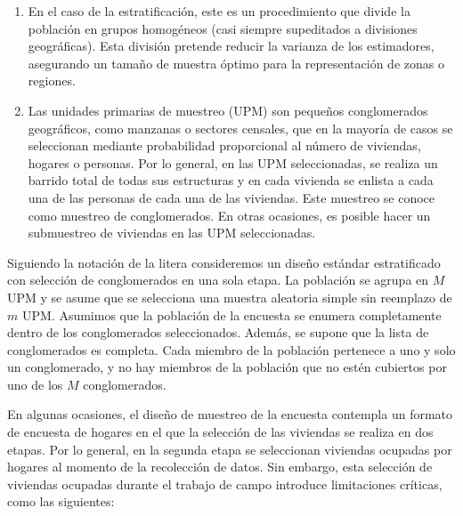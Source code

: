 \documentclass[
  12pt,
]{book}
\providecommand{\tightlist}{%
  \setlength{\itemsep}{0pt}\setlength{\parskip}{0pt}}
\begin{document}
\begin{enumerate}
\def\labelenumi{\arabic{enumi}.}
\tightlist
\item
  En el caso de la estratificación, este es un procedimiento que divide la población en grupos homogéneos (casi siempre supeditados a divisiones geográficas). Esta división pretende reducir la varianza de los estimadores, asegurando un tamaño de muestra óptimo para la representación de zonas o regiones.
\item
  Las unidades primarias de muestreo (UPM) son pequeños conglomerados geográficos, como manzanas o sectores censales, que en la mayoría de casos se seleccionan mediante probabilidad proporcional al número de viviendas, hogares o personas. Por lo general, en las UPM seleccionadas, se realiza un barrido total de todas sus estructuras y en cada vivienda se enlista a cada una de las personas de cada una de las viviendas. Este muestreo se conoce como muestreo de conglomerados. En otras ocasiones, es posible hacer un submuestreo de viviendas en las UPM seleccionadas.
\end{enumerate}

Siguiendo la notación de la litera consideremos un diseño estándar estratificado con selección de conglomerados en una sola etapa. La población se agrupa en \(M\) UPM y se asume que se selecciona una muestra aleatoria simple sin reemplazo de \(m\) UPM. Asumimos que la población de la encuesta se enumera completamente dentro de los conglomerados seleccionados. Además, se supone que la lista de conglomerados es completa. Cada miembro de la población pertenece a uno y solo un conglomerado, y no hay miembros de la población que no estén cubiertos por uno de los \(M\) conglomerados.

En algunas ocasiones, el diseño de muestreo de la encuesta contempla un formato de encuesta de hogares en el que la selección de las viviendas se realiza en dos etapas. Por lo general, en la segunda etapa se seleccionan viviendas ocupadas por hogares al momento de la recolección de datos. Sin embargo, esta selección de viviendas ocupadas durante el trabajo de campo introduce limitaciones críticas, como las siguientes:
\end{document}

